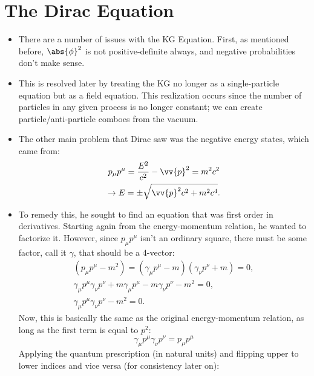 \section{The Dirac Equation}



\begin{itemize}
    \item There are a number of issues with the KG Equation. First, as mentioned before, $\abs{\phi}^2$ is not positive-definite always, and negative probabilities don't make sense.
    \item This is resolved later by treating the KG no longer as a single-particle equation but as a field equation. This realization occurs since the number of particles in any given process is no longer constant; we can create particle/anti-particle comboes from the vacuum.
    \item The other main problem that Dirac saw was the negative energy states, which came from:
        \begin{gather}
            p_{\mu}p^{\mu} = \frac{E^2}{c^2} - \vv{p}^2 = m^2c^2 \\
            \rightarrow E = \pm \sqrt{\vv{p}^2c^2 + m^2c^4}.
        \end{gather}
    \item To remedy this, he sought to find an equation that was first order in derivatives. Starting again from the energy-momentum relation, he wanted to factorize it. However, since $p_{\mu}p^{\mu}$ isn't an ordinary square, there must be some factor, call it $\gamma$, that should be a 4-vector:
        \begin{gather}
            (p_{\mu}p^{\mu} - m^2) = (\gamma_{\mu}p^{\mu} - m)(\gamma_{\nu}p^{\nu} + m) = 0, \\
            \gamma_{\mu}p^{\mu}\gamma_{\nu}p^{\nu} + m\gamma_{\mu}p^{\mu} - m\gamma_{\nu}p^{\nu} - m^2 = 0, \\
            \gamma_{\mu}p^{\mu}\gamma_{\nu}p^{\nu} - m^2 = 0.
        \end{gather}
        Now, this is basically the same as the original energy-momentum relation, as long as the first term is equal to $p^2$:
        \begin{equation}
            \gamma_{\mu}p^{\mu}\gamma_{\nu}p^{\nu} = p_{\mu}p^{\mu}
        \end{equation}
        Applying the quantum prescription (in natural units) and flipping upper to lower indices and vice versa (for consistency later on):
        \begin{gather}

\end{gather}
\end{itemize}
